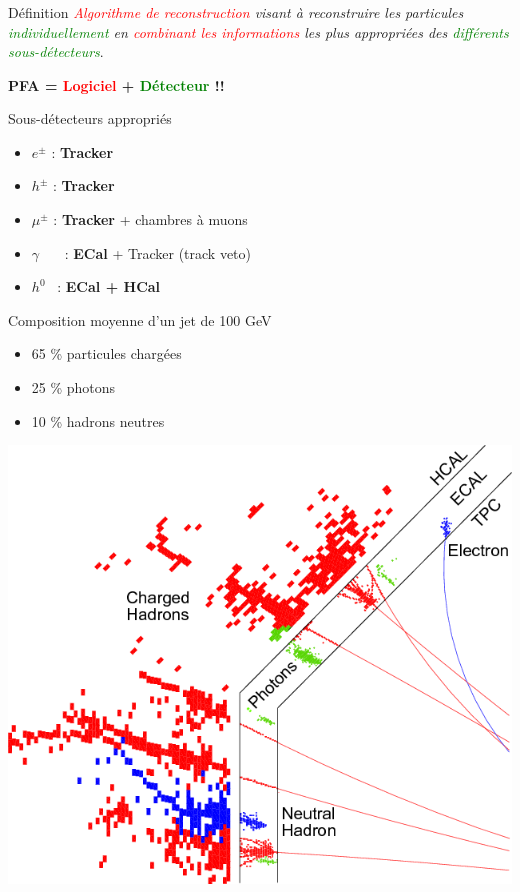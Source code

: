 \documentclass[8pt]{beamer}
\begin{document}
  \begin{frame}
  \frametitle{\secname}
  \framesubtitle{\subsecname}
    \begin{block}{Définition}
      \textit{\textcolor{red}{Algorithme de reconstruction} visant à reconstruire les particules \textcolor{green}{individuellement} en \textcolor{red}{combinant les informations} les plus appropriées des \textcolor{green}{différents sous-détecteurs}}.
    \end{block}
    \pause
    \begin{center} \textbf{\large PFA = \textcolor{red}{Logiciel} + \textcolor{green}{Détecteur} !!} \end{center}
    \pause
    \begin{minipage}{0.48\linewidth}
      \begin{block}{Sous-détecteurs appropriés}
        \begin{itemize}
          \item $e^{\pm}$ : \textbf{Tracker}
          \item $h^{\pm}$ : \textbf{Tracker}
          \item $\mu^{\pm}$ : \textbf{Tracker} + chambres à muons
          \item $\gamma$ ~~~: \textbf{ECal} + Tracker (track veto)
          \item $h^{0}$ ~: \textbf{ECal + HCal}
        \end{itemize}
      \end{block}
      \begin{block}{Composition moyenne d'un jet de 100 GeV}
        \begin{itemize}
          \item 65 \% particules chargées
          \item 25 \% photons
          \item 10 \% hadrons neutres
        \end{itemize}
      \end{block}
    \end{minipage} \hfill
    \begin{minipage}{0.5\linewidth}
      \begin{center}
        \includegraphics[width=0.95\linewidth]{pfa_event_display.png}

\end{center}
\end{minipage}
\end{frame}
\end{document}
